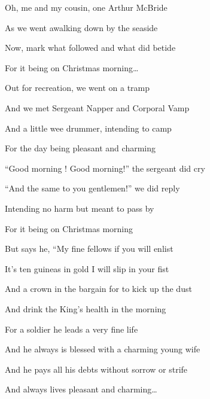 \documentclass[letterpaper,10pt,english]{sphinxmanual}
\begin{document}
\begin{DUlineblock}{0em}
\item[] Oh, me and my cousin, one Arthur McBride
\item[] As we went a\sphinxhyphen{}walking down by the seaside
\item[] Now, mark what followed and what did betide
\item[] For it being on Christmas morning…
\end{DUlineblock}

\begin{DUlineblock}{0em}
\item[] Out for recreation, we went on a tramp
\item[] And we met Sergeant Napper and Corporal Vamp
\item[] And a little wee drummer, intending to camp
\item[] For the day being pleasant and charming
\end{DUlineblock}

\begin{DUlineblock}{0em}
\item[] “Good morning ! Good morning!” the sergeant did cry
\item[] “And the same to you gentlemen!” we did reply
\item[] Intending no harm but meant to pass by
\item[] For it being on Christmas morning
\end{DUlineblock}

\begin{DUlineblock}{0em}
\item[] But says he, “My fine fellows if you will enlist
\item[] It’s ten guineas in gold I will slip in your fist
\item[] And a crown in the bargain for to kick up the dust
\item[] And drink the King’s health in the morning
\end{DUlineblock}

\begin{DUlineblock}{0em}
\item[] For a soldier he leads a very fine life
\item[] And he always is blessed with a charming young wife
\item[] And he pays all his debts without sorrow or strife
\item[] And always lives pleasant and charming…
\end{DUlineblock}
\end{document}
